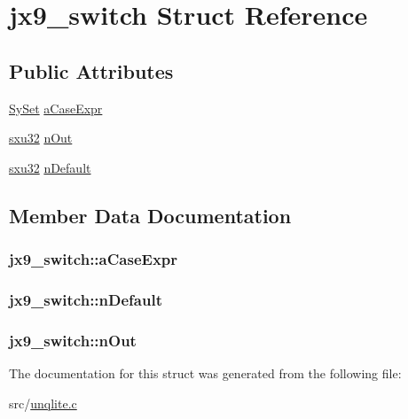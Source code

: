 \hypertarget{structjx9__switch}{\section{jx9\-\_\-switch Struct Reference}
\label{d3/d12/structjx9__switch}
}
\subsection*{Public Attributes}
\begin{DoxyCompactItemize}
\item 
\hyperlink{struct_sy_set}{Sy\-Set} \hyperlink{structjx9__switch_a7b8d3f0d039c7c5d74d7d44781b1c82a}{a\-Case\-Expr}
\item 
\hyperlink{unqlite_8c_abc5a8a3f345c200c98c485551f49666e}{sxu32} \hyperlink{structjx9__switch_a6b523fffae3d12d7d9728487962907e9}{n\-Out}
\item 
\hyperlink{unqlite_8c_abc5a8a3f345c200c98c485551f49666e}{sxu32} \hyperlink{structjx9__switch_aecb7f96e171158bfd2b0f96584cf5d4b}{n\-Default}
\end{DoxyCompactItemize}


\subsection{Member Data Documentation}
\hypertarget{structjx9__switch_a7b8d3f0d039c7c5d74d7d44781b1c82a}{
\subsubsection[{a\-Case\-Expr}]{ jx9\-\_\-switch\-::a\-Case\-Expr}}\label{d3/d12/structjx9__switch_a7b8d3f0d039c7c5d74d7d44781b1c82a}
\hypertarget{structjx9__switch_aecb7f96e171158bfd2b0f96584cf5d4b}{
\subsubsection[{n\-Default}]{ jx9\-\_\-switch\-::n\-Default}}\label{d3/d12/structjx9__switch_aecb7f96e171158bfd2b0f96584cf5d4b}
\hypertarget{structjx9__switch_a6b523fffae3d12d7d9728487962907e9}{
\subsubsection[{n\-Out}]{ jx9\-\_\-switch\-::n\-Out}}\label{d3/d12/structjx9__switch_a6b523fffae3d12d7d9728487962907e9}


The documentation for this struct was generated from the following file\-:\begin{DoxyCompactItemize}
\item 
src/\hyperlink{unqlite_8c}{unqlite.\-c}\end{DoxyCompactItemize}
